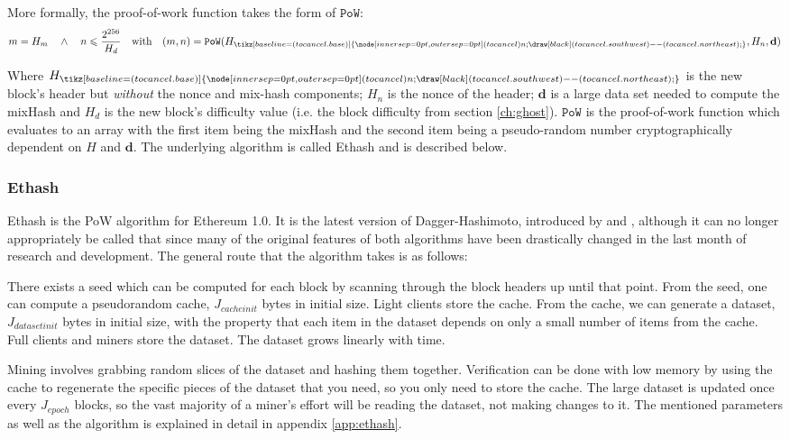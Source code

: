 \documentclass[9pt,oneside]{amsart}
\newcommand{\hcancel}[1]{%
    \tikz[baseline=(tocancel.base)]{
        \node[inner sep=0pt,outer sep=0pt] (tocancel) {#1};
        \draw[black] (tocancel.south west) -- (tocancel.north east);
    }%
}%
\begin{document}
\begin{multicols}{2}
More formally, the proof-of-work function takes the form of $\mathtt{PoW}$:
\begin{equation}
m = H_m \quad \wedge \quad n \leqslant \frac{2^{256}}{H_d} \quad \text{with} \quad (m, n) = \mathtt{PoW}(H_{\hcancel{n}}, H_n, \mathbf{d})
\end{equation}

Where $H_{\hcancel{n}}$ is the new block's header but \textit{without} the nonce and mix-hash components; $H_n$ is the nonce of the header; $\mathbf{d}$ is a large data set needed to compute the mixHash and $H_d$ is the new block's difficulty value (i.e. the block difficulty from section \ref{ch:ghost}). $\mathtt{PoW}$ is the proof-of-work function which evaluates to an array with the first item being the mixHash and the second item being a pseudo-random number cryptographically dependent on $H$ and $\mathbf{d}$. The underlying algorithm is called Ethash and is described below.
\subsubsection{Ethash}
Ethash is the PoW algorithm for Ethereum 1.0. It is the latest version of Dagger-Hashimoto, introduced by \cite{dagger} and \cite{hashimoto}, although it can no longer appropriately be called that since many of the original features of both algorithms have been drastically changed in the last month of research and development. The general route that the algorithm takes is as follows:

There exists a seed which can be computed for each block by scanning through the block headers up until that point. From the seed, one can compute a pseudorandom cache, $J_{cacheinit}$ bytes in initial size. Light clients store the cache. From the cache, we can generate a dataset, $J_{datasetinit}$ bytes in initial size, with the property that each item in the dataset depends on only a small number of items from the cache. Full clients and miners store the dataset. The dataset grows linearly with time.

Mining involves grabbing random slices of the dataset and hashing them together. Verification can be done with low memory by using the cache to regenerate the specific pieces of the dataset that you need, so you only need to store the cache. The large dataset is updated once every $J_{epoch}$ blocks, so the vast majority of a miner's effort will be reading the dataset, not making changes to it. The mentioned parameters as well as the algorithm is explained in detail in appendix \ref{app:ethash}.


\end{multicols}
\end{document}

